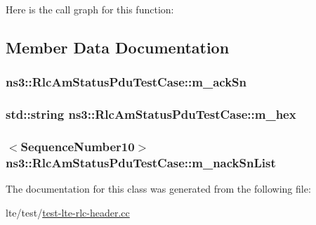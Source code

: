 Here is the call graph for this function\+:




\subsection{Member Data Documentation}
\subsubsection[{\texorpdfstring{m\+\_\+ack\+Sn}{m_ackSn}}]{ ns3\+::\+Rlc\+Am\+Status\+Pdu\+Test\+Case\+::m\+\_\+ack\+Sn\hspace{0.3cm}{\ttfamily [protected]}}\hypertarget{classns3_1_1RlcAmStatusPduTestCase_a85b9fb8db0cebdec174b75f79ce32cc3}{}\label{classns3_1_1RlcAmStatusPduTestCase_a85b9fb8db0cebdec174b75f79ce32cc3}
\subsubsection[{\texorpdfstring{m\+\_\+hex}{m_hex}}]{\setlength{\rightskip}{0pt plus 5cm}std\+::string ns3\+::\+Rlc\+Am\+Status\+Pdu\+Test\+Case\+::m\+\_\+hex\hspace{0.3cm}{\ttfamily [protected]}}\hypertarget{classns3_1_1RlcAmStatusPduTestCase_a1c5a4599d69e0f98722c2c5e3c89bf76}{}\label{classns3_1_1RlcAmStatusPduTestCase_a1c5a4599d69e0f98722c2c5e3c89bf76}
\subsubsection[{\texorpdfstring{m\+\_\+nack\+Sn\+List}{m_nackSnList}}]{$<${\bf Sequence\+Number10}$>$ ns3\+::\+Rlc\+Am\+Status\+Pdu\+Test\+Case\+::m\+\_\+nack\+Sn\+List\hspace{0.3cm}{\ttfamily [protected]}}\hypertarget{classns3_1_1RlcAmStatusPduTestCase_a31448a699ee0c00b8176dc83bd1e6635}{}\label{classns3_1_1RlcAmStatusPduTestCase_a31448a699ee0c00b8176dc83bd1e6635}


The documentation for this class was generated from the following file\+:\begin{DoxyCompactItemize}
\item 
lte/test/\hyperlink{test-lte-rlc-header_8cc}{test-\/lte-\/rlc-\/header.\+cc}\end{DoxyCompactItemize}
